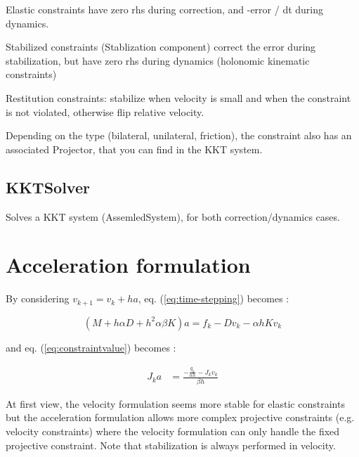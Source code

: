 \documentclass{article}
\newcommand{\block}[1]{\left(#1\right)}
\begin{document}
Elastic constraints have zero rhs during correction, and -error / dt
during dynamics.

Stabilized constraints (Stablization component) correct the error
during stabilization, but have zero rhs during dynamics (holonomic
kinematic constraints)

Restitution constraints: stabilize when velocity is small and when the constraint is not violated,
otherwise flip relative velocity.

Depending on the type (bilateral, unilateral, friction), the
constraint also has an associated Projector, that you can find in the
KKT system.

\subsection{KKTSolver}
Solves a KKT system (AssemledSystem), for both correction/dynamics cases.



\section{Acceleration formulation}

By considering $v_{k+1} = v_k + h a $, eq. (\ref{eq:time-stepping}) becomes :

\begin{equation}
  \block{M + h\alpha D + h^2 \alpha \beta K} a = 
  f_k - D v_k - \alpha h K v_k
\end{equation}

and eq. (\ref{eq:constraintvalue}) becomes :

\begin{align}
  J_k a &= \frac{ -\frac{g_k}{\alpha h} - J_k v_k } {\beta h}
\end{align}

At first view, the velocity formulation seems more stable for elastic constraints but the acceleration formulation allows more complex projective constraints (e.g. velocity constraints) where the velocity formulation can only handle the fixed projective constraint.
Note that stabilization is always performed in velocity.
\end{document}
